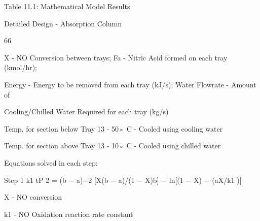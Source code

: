 \documentclass[a4paper,portrait,12pt]{article}
\begin{document}
\begin{flushleft}
Table 11.1: Mathematical Model Results
\end{flushleft}





\begin{flushleft}
\newpage
Detailed Design - Absorption Column
\end{flushleft}





66





\begin{flushleft}
X - NO Conversion between trays; Fa - Nitric Acid formed on each tray (kmol/hr);
\end{flushleft}


\begin{flushleft}
Energy - Energy to be removed from each tray (kJ/s); Water Flowrate - Amount of
\end{flushleft}


\begin{flushleft}
Cooling/Chilled Water Required for each tray (kg/s)
\end{flushleft}


\begin{flushleft}
Temp. for section below Tray 13 - 50◦ C - Cooled using cooling water
\end{flushleft}


\begin{flushleft}
Temp. for section above Tray 13 - 10◦ C - Cooled using chilled water
\end{flushleft}


\begin{flushleft}
Equations solved in each step:
\end{flushleft}


\begin{flushleft}
Step 1 k1 tP 2 = (b $-$ a)$-$2 [X(b $-$ a)/(1 $-$ X)b] $-$ ln[(1 $-$ X) $-$ (aX/k1 )]
\end{flushleft}


\begin{flushleft}
X - NO conversion
\end{flushleft}


\begin{flushleft}
k1 - NO Oxidation reaction rate constant
\end{flushleft}
\end{document}
